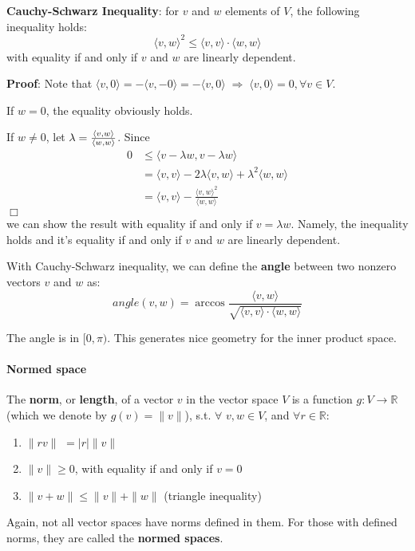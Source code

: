 \documentclass[12pt,oneside]{article}
\begin{document}
\noindent \textbf{Cauchy-Schwarz Inequality}: for $v$ and $w$ elements of $V$, the following inequality holds:
\[
\langle v,w \rangle^2\leq \langle v,v \rangle \cdot \langle w,w \rangle
\]
with equality if and only if $v$ and $w$ are linearly dependent.

\textbf{Proof}: Note that $\langle v,0 \rangle= -\langle v,-0 \rangle= -\langle v,0 \rangle \;\Rightarrow\; \langle v,0 \rangle=0,\forall v \in V.$

If $w=0$, the equality obviously holds.

If $w\neq0$, let $\lambda={\langle v,w \rangle \over \langle w,w \rangle}$. Since
\[
\begin{aligned}
0 &\leq \langle v - \lambda w, v - \lambda w \rangle \\
  &= \langle v,v \rangle - 2\lambda \langle v, w \rangle +\lambda^2 \langle w, w \rangle \\
  &= \langle v,v \rangle - \frac{\langle v,w \rangle^2 }{\langle w,w \rangle}
\end{aligned}
\] $\Box$\\

\noindent  we can show the result with equality if and only if $v=\lambda w$.
Namely, the inequality holds and it's equality if and only if $v$ and $w$ are linearly dependent.

With Cauchy-Schwarz inequality, we can define the \textbf{angle} between two nonzero vectors $v$ and $w$ as:
\[
angle(v,w)=\arccos{ \frac {\langle v,w \rangle } {\sqrt{ \langle v,v \rangle \cdot \langle w,w \rangle}} }
\]

The angle is in $[0,\pi)$. This generates nice geometry for the inner product space.

\paragraph{Normed space}
The \textbf{norm}, or \textbf{length}, of a vector $v$ in the vector space $V$ is
 a function $g: V \rightarrow \mathbb{R}$ (which we denote by $g(v)= \|v\|$),
s.t. $\forall$ $v, w\in V$, and $\forall r \in \mathbb{R}$:
\begin{enumerate}
\item $\|rv\|$ $= |r|\|v\|$ 
\item $\|v\| \geq 0$, with equality if and only if $v=0$
\item $\|v+ w\| \leq \|v\|+\|w\|$ (triangle inequality)
\end{enumerate}

Again, not all vector spaces have norms defined in them. 
For those with defined norms, they are called the \textbf{normed spaces}.
\end{document}
